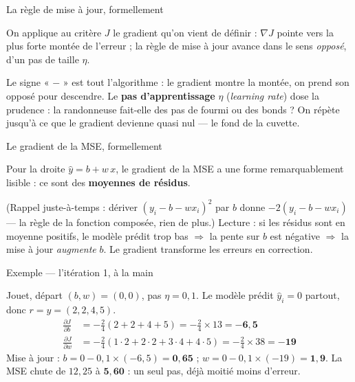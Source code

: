 \documentclass[aspectratio=169,11pt]{beamer}
\begin{document}
\begin{frame}{La règle de mise à jour, formellement}
\begin{ucaddef}[Définition]
{\small On applique au critère $J$ le gradient qu'on vient de définir : $\nabla J$ pointe vers la plus forte montée de l'erreur ; la règle de mise à jour avance dans le sens \emph{opposé}, d'un pas de taille $\eta$.}
\end{ucaddef}
{\small Le signe « $-$ » est tout l'algorithme : le gradient montre la montée, on prend son opposé pour descendre. Le \textbf{pas d'apprentissage} $\eta$ (\emph{learning rate}) dose la prudence : la randonneuse fait-elle des pas de fourmi ou des bonds ? On répète jusqu'à ce que le gradient devienne quasi nul — le fond de la cuvette.}
\end{frame}

\begin{frame}{Le gradient de la MSE, formellement}
\begin{ucaddef}
{\small Pour la droite $\hat y = b + w\,x$, le gradient de la MSE a une forme remarquablement lisible : ce sont des \textbf{moyennes de résidus}.}
\end{ucaddef}
{\small (Rappel juste-à-temps : dériver $(y_i - b - w x_i)^2$ par $b$ donne $-2(y_i - b - w x_i)$ — la règle de la fonction composée, rien de plus.) Lecture : si les résidus sont en moyenne positifs, le modèle prédit trop bas $\Rightarrow$ la pente sur $b$ est négative $\Rightarrow$ la mise à jour \emph{augmente} $b$. Le gradient transforme les erreurs en correction.}
\end{frame}

\begin{frame}{Exemple — l'itération 1, à la main}
\begin{ucadex}
{\small Jouet, départ $(b,w) = (0,0)$, pas $\eta = 0{,}1$. Le modèle prédit $\hat y_i = 0$ partout, donc $r = y = (2,2,4,5)$.
\begin{align*}
\frac{\partial J}{\partial b} &= -\tfrac{2}{4}(2+2+4+5) = -\tfrac{2}{4}\times 13 = \mathbf{-6{,}5}\\[1pt]
\frac{\partial J}{\partial w} &= -\tfrac{2}{4}(1\!\cdot\!2+2\!\cdot\!2+3\!\cdot\!4+4\!\cdot\!5) = -\tfrac{2}{4}\times 38 = \mathbf{-19}
\end{align*}
Mise à jour : $b = 0 - 0{,}1\times(-6{,}5) = \mathbf{0{,}65}$ ; $w = 0 - 0{,}1\times(-19) = \mathbf{1{,}9}$. La MSE chute de $12{,}25$ à $\mathbf{5{,}60}$ : un seul pas, déjà moitié moins d'erreur.}
\end{ucadex}
\end{frame}
\end{document}
